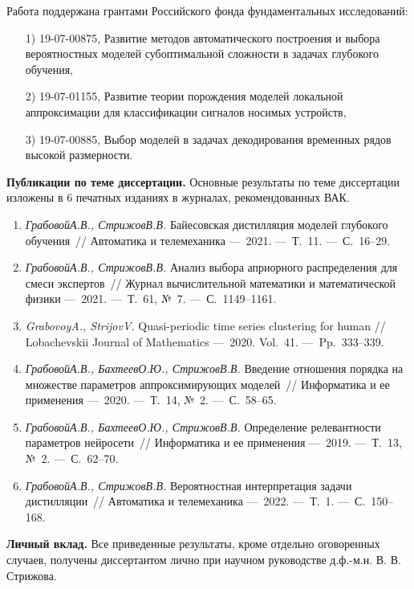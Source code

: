 Работа поддержана грантами Российского фонда фундаментальных исследований:

\begin{enumerate}
    \item[1)] 19-07-00875, Развитие методов автоматического построения и выбора вероятностных моделей субоптимальной сложности в задачах глубокого обучения,
    \item[2)] 19-07-01155, Развитие теории порождения моделей локальной аппроксимации для классификации сигналов носимых устройств,
    \item[3)] 19-07-00885, Выбор моделей в задачах декодирования временных рядов высокой размерности.
\end{enumerate}

\vspace{0.5cm}
\textbf{Публикации по теме диссертации.} Основные результаты по теме диссертации изложены в 6 печатных изданиях в журналах, рекомендованных ВАК.
\begin{enumerate}
    \item \textit{Грабовой\;А.В., Стрижов\;В.В.} Байесовская дистилляция моделей глубокого обучения~// Автоматика и телемеханика ---~2021. ---~Т.~11. ---~С.~16--29.
    \item \textit{Грабовой\;А.В., Стрижов\;В.В.} Анализ выбора априорного распределения для смеси экспертов~// Журнал вычислительной математики и математической физики ---~2021. ---~Т.~61, №~7. ---~С.~1149--1161.
    \item \textit{Grabovoy\;A., Strijov\;V.} Quasi-periodic time series clustering for human // Lobachevskii Journal of Mathematics ---~2020. Vol.~41. ---~Pp.~333--339.
    \item \textit{Грабовой\;А.В., Бахтеев\;О.Ю., Стрижов\;В.В.} Введение отношения порядка на множестве параметров аппроксимирующих моделей~// Информатика и ее применения ---~2020. ---~Т.~14, №~2. ---~С.~58--65.
    \item \textit{Грабовой\;А.В., Бахтеев\;О.Ю., Стрижов\;В.В.} Определение релевантности параметров нейросети~// Информатика и ее применения ---~2019. ---~Т.~13, №~2. ---~С.~62--70.
    \item \textit{Грабовой\;А.В., Стрижов\;В.В.} Вероятностная интерпретация задачи дистилляции~// Автоматика и телемеханика ---~2022. ---~Т.~1. ---~С.~150--168.
\end{enumerate}

\vspace{0.5cm}
\textbf{Личный вклад.} Все приведенные результаты, кроме отдельно оговоренных случаев, получены диссертантом лично при научном руководстве д.ф.-м.н. В. В. Стрижова.

